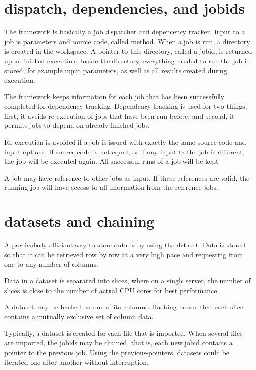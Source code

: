 
\section{dispatch, dependencies, and jobids}
The framework is basically a job dispatcher and depencency tracker.
Input to a job is parameters and source code, called method.  When a
job is run, a directory is created in the workspace.  A pointer to
this directory, called a jobid, is returned upon finished execution.
Inside the directory, everything needed to run the job is stored, for
example input parameters, as well as all results created during
execution.

The framework keeps information for each job that has been
successfully completed for dependency tracking.  Dependency tracking
is used for two things: first, it avoids re-execution of jobs that
have been run before; and second, it permits jobs to depend on already
finished jobs.

Re-execution is avoided if a job is issued with exactly the same
source code and input options.  If source code is not equal, or if any
input to the job is different, the job will be executed again.  All
successful runs of a job will be kept.

A job may have reference to other jobs as input.  If these references
are valid, the running job will have access to all information from
the reference jobs.



\section{datasets and chaining}
A particularly efficient way to store data is by using the dataset.
Data is stored so that it can be retrieved row by row at a very high
pace and requesting from one to any number of columns.

Data in a dataset is separated into slices, where on a single server,
the number of slices is close to the number of actual CPU cores for
best performance.

A dataset may be hashed on one of its columns.  Hashing means that
each slice contains a mutually exclusive set of column data.

Typically, a dataset is created for each file that is imported.  When
several files are imported, the jobids may be chained, that is, each
new jobid contains a pointer to the previous job.  Using the
previous-pointers, datasets could be iterated one after another
without interruption.



